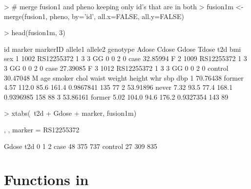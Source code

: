 \begin{Schunk}
\begin{Sinput}
> # merge fusion1 and pheno keeping only id's that are in both
> fusion1m <- merge(fusion1, pheno, by='id', all.x=FALSE, all.y=FALSE)
\end{Sinput}
\end{Schunk}
\begin{Schunk}
\begin{Sinput}
> head(fusion1m, 3)
\end{Sinput}
\begin{Soutput}
    id     marker markerID allele1 allele2 genotype Adose Cdose Gdose Tdose     t2d      bmi sex
1 1002 RS12255372        1       3       3       GG     0     0     2     0    case 32.85994   F
2 1009 RS12255372        1       3       3       GG     0     0     2     0    case 27.39085   F
3 1012 RS12255372        1       3       3       GG     0     0     2     0 control 30.47048   M
       age smoker chol waist weight height       whr sbp dbp
1 70.76438 former 4.57 112.0   85.6  161.4 0.9867841 135  77
2 53.91896  never 7.32  93.5   77.4  168.1 0.9396985 158  88
3 53.86161 former 5.02 104.0   94.6  176.2 0.9327354 143  89
\end{Soutput}
\begin{Sinput}
> xtabs(~t2d + Gdose + marker, fusion1m)
\end{Sinput}
\begin{Soutput}
, , marker = RS12255372

         Gdose
t2d         0   1   2
  case     48 375 737
  control  27 309 835
\end{Soutput}
\end{Schunk}

\section{Functions in \R} %
\label{sec:writingFunctions}
%

